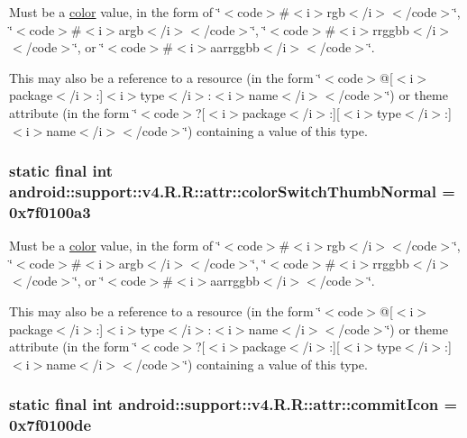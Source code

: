 Must be a \hyperlink{classandroid_1_1support_1_1v4_1_1_r_1_1color}{color} value, in the form of \char`\"{}$<$code$>$\#$<$i$>$rgb$<$/i$>$$<$/code$>$\char`\"{}, \char`\"{}$<$code$>$\#$<$i$>$argb$<$/i$>$$<$/code$>$\char`\"{}, \char`\"{}$<$code$>$\#$<$i$>$rrggbb$<$/i$>$$<$/code$>$\char`\"{}, or \char`\"{}$<$code$>$\#$<$i$>$aarrggbb$<$/i$>$$<$/code$>$\char`\"{}. 

This may also be a reference to a resource (in the form \char`\"{}$<$code$>$@\mbox{[}$<$i$>$package$<$/i$>$:\mbox{]}$<$i$>$type$<$/i$>$:$<$i$>$name$<$/i$>$$<$/code$>$\char`\"{}) or theme attribute (in the form \char`\"{}$<$code$>$?\mbox{[}$<$i$>$package$<$/i$>$:\mbox{]}\mbox{[}$<$i$>$type$<$/i$>$:\mbox{]}$<$i$>$name$<$/i$>$$<$/code$>$\char`\"{}) containing a value of this type. \hypertarget{classandroid_1_1support_1_1v4_1_1_r_1_1attr_e6bd0d251b78dcb183b547843a3ad4a7}{
\subsubsection[{colorSwitchThumbNormal}]{\setlength{\rightskip}{0pt plus 5cm}static final int android::support::v4.R.R::attr::colorSwitchThumbNormal = 0x7f0100a3}}
\label{classandroid_1_1support_1_1v4_1_1_r_1_1attr_e6bd0d251b78dcb183b547843a3ad4a7}


Must be a \hyperlink{classandroid_1_1support_1_1v4_1_1_r_1_1color}{color} value, in the form of \char`\"{}$<$code$>$\#$<$i$>$rgb$<$/i$>$$<$/code$>$\char`\"{}, \char`\"{}$<$code$>$\#$<$i$>$argb$<$/i$>$$<$/code$>$\char`\"{}, \char`\"{}$<$code$>$\#$<$i$>$rrggbb$<$/i$>$$<$/code$>$\char`\"{}, or \char`\"{}$<$code$>$\#$<$i$>$aarrggbb$<$/i$>$$<$/code$>$\char`\"{}. 

This may also be a reference to a resource (in the form \char`\"{}$<$code$>$@\mbox{[}$<$i$>$package$<$/i$>$:\mbox{]}$<$i$>$type$<$/i$>$:$<$i$>$name$<$/i$>$$<$/code$>$\char`\"{}) or theme attribute (in the form \char`\"{}$<$code$>$?\mbox{[}$<$i$>$package$<$/i$>$:\mbox{]}\mbox{[}$<$i$>$type$<$/i$>$:\mbox{]}$<$i$>$name$<$/i$>$$<$/code$>$\char`\"{}) containing a value of this type. \hypertarget{classandroid_1_1support_1_1v4_1_1_r_1_1attr_be4565e3d2340753b6e802d9d1f53e47}{
\subsubsection[{commitIcon}]{\setlength{\rightskip}{0pt plus 5cm}static final int android::support::v4.R.R::attr::commitIcon = 0x7f0100de}}
\label{classandroid_1_1support_1_1v4_1_1_r_1_1attr_be4565e3d2340753b6e802d9d1f53e47}


